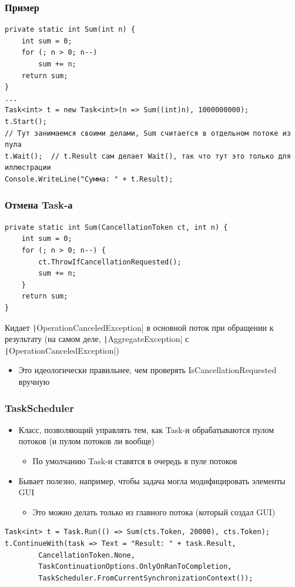 \documentclass[xetex,mathserif,serif]{beamer}
\begin{document}
	\begin{frame}[fragile]
		\frametitle{Пример}
		\begin{footnotesize}
			\begin{verbatim}
private static int Sum(int n) {
    int sum = 0;
    for (; n > 0; n--)
        sum += n;
    return sum;
}
...
Task<int> t = new Task<int>(n => Sum((int)n), 1000000000);
t.Start();
// Тут занимаемся своими делами, Sum считается в отдельном потоке из пула
t.Wait();  // t.Result сам делает Wait(), так что тут это только для иллюстрации
Console.WriteLine("Сумма: " + t.Result);
			\end{verbatim}
		\end{footnotesize}
	\end{frame}

	\begin{frame}[fragile]
		\frametitle{Отмена Task-а}
		\begin{verbatim}
private static int Sum(CancellationToken ct, int n) {
    int sum = 0;
    for (; n > 0; n--) {
        ct.ThrowIfCancellationRequested();
        sum += n;
    }
    return sum;
}
		\end{verbatim}
		\vspace{3mm}
		Кидает \texttt|OperationCanceledException| в основной поток при обращении к результату (на самом деле, \texttt|AggregateException| с \texttt|OperationCanceledException|)
		\begin{itemize}
			\item Это идеологически правильнее, чем проверять IsCancellationRequested вручную
		\end{itemize}
	\end{frame}

	\begin{frame}[fragile]
		\frametitle{TaskScheduler}
		\begin{itemize}
			\item Класс, позволяющий управлять тем, как Task-и обрабатываются пулом потоков (и пулом потоков ли вообще)
			\begin{itemize}
				\item По умолчанию Task-и ставятся в очередь в пуле потоков
			\end{itemize}
			\item Бывает полезно, например, чтобы задача могла модифицировать элементы GUI
			\begin{itemize}
				\item Это можно делать только из главного потока (который создал GUI)
			\end{itemize}
		\end{itemize}

		\begin{small}
			\begin{verbatim}
Task<int> t = Task.Run(() => Sum(cts.Token, 20000), cts.Token);
t.ContinueWith(task => Text = "Result: " + task.Result,
        CancellationToken.None,
        TaskContinuationOptions.OnlyOnRanToCompletion,
        TaskScheduler.FromCurrentSynchronizationContext());
			\end{verbatim}
		\end{small}
	\end{frame}
\end{document}
